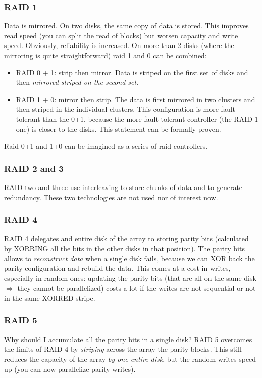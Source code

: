 \documentclass[10pt,a4paper]{article}
\begin{document}
				\subsubsection{RAID 1}
					Data is mirrored. On two disks, the same copy of data is stored. This improves read speed (you can split the read of blocks) but worsen capacity and write speed. Obviously, reliability is increased. On more than 2 disks (where the mirroring is quite straightforward) raid 1 and 0 can be combined:
					\begin{itemize}
						\item RAID 0 + 1: strip then mirror. Data is striped on the first set of disks and then \emph{mirrored striped on the second set}. 
						\item RAID 1 + 0: mirror then strip. The data is first mirrored in two clusters and then striped in the individual clusters. This configuration is more fault tolerant than the 0+1, because the more fault tolerant controller (the RAID 1 one) is closer to the disks. This statement can be formally proven. 
					\end{itemize}
					Raid 0+1 and 1+0 can be imagined as a series of raid controllers.
					
				\subsubsection{RAID 2 and 3}
					RAID two and three use interleaving to store chunks of data and to generate redundancy. These two technologies are not used nor of interest now.
					
				
				\subsubsection{RAID 4}
					RAID 4 delegates and entire disk of the array to storing parity bits (calculated by XORRING all the bits in the other disks in that position). The parity bits allows to \emph{reconstruct data} when a single disk fails, because we can XOR back the parity configuration and rebuild the data. This comes at a cost in writes, especially in random ones: updating the parity bits (that are all on the same disk $\Rightarrow$ they cannot be parallelized) costs a lot if the writes are not sequential or not in the same XORRED stripe. 
				
				\subsubsection{RAID 5}
					Why should I accumulate all the parity bits in a single disk? RAID 5 overcomes the limits of RAID 4 by \emph{striping} across the array the parity blocks. This still reduces the capacity of the array \emph{by one entire disk}, but the random writes speed up (you can now parallelize parity writes).\\
					
\end{document}
